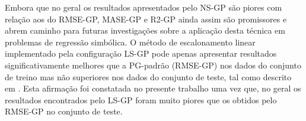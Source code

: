 Embora que no geral os resultados apresentados pelo NS-GP são piores com relação aos do RMSE-GP, MASE-GP e R2-GP ainda assim são 
promissores e abrem caminho para futuras investigações sobre a aplicação desta técnica em problemas de regressão simbólica.
O método de escalonamento linear implementado pela configuração LS-GP pode apenas apresentar resultados significativamente melhores 
que a PG-padrão (RMSE-GP) nos dados do conjunto de treino mas não superiores nos dados do conjunto de teste, tal como descrito 
em \citep{costelloe2009improving}. Esta afirmação foi constatada no presente trabalho uma vez que, no geral os resultados encontrados 
pelo LS-GP foram muito piores que os obtidos pelo RMSE-GP no conjunto de teste.



%
%
%
%